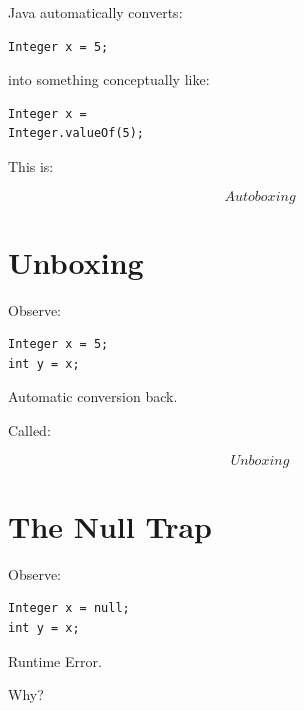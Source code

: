 \documentclass[11pt,a4paper]{book}
\begin{document}
Java automatically converts:

\begin{verbatim}
Integer x = 5;
\end{verbatim}


into something conceptually like:

\begin{verbatim}
Integer x =
Integer.valueOf(5);
\end{verbatim}


This is:

\[
Autoboxing
\]


\section{Unboxing}

Observe:

\begin{verbatim}
Integer x = 5;
int y = x;
\end{verbatim}


Automatic conversion back.


Called:

\[
Unboxing
\]


\section{The Null Trap}

Observe:

\begin{verbatim}
Integer x = null;
int y = x;
\end{verbatim}


Runtime Error.


Why?

\end{document}
